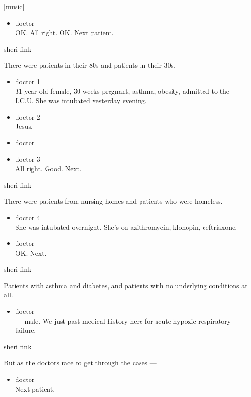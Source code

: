 {[}music{]}

\begin{itemize}
\tightlist
\item
  doctor\\
  OK. All right. OK. Next patient.
\end{itemize}

sheri fink

There were patients in their 80s and patients in their 30s.

\begin{itemize}
\item
  doctor 1\\
  31-year-old female, 30 weeks pregnant, asthma, obesity, admitted to
  the I.C.U. She was intubated yesterday evening.
\item
  doctor 2\\
  Jesus.
\item
  doctor
\item
  doctor 3\\
  All right. Good. Next.
\end{itemize}

sheri fink

There were patients from nursing homes and patients who were homeless.

\begin{itemize}
\item
  doctor 4\\
  She was intubated overnight. She's on azithromycin, klonopin,
  ceftriaxone.
\item
  doctor\\
  OK. Next.
\end{itemize}

sheri fink

Patients with asthma and diabetes, and patients with no underlying
conditions at all.

\begin{itemize}
\tightlist
\item
  doctor\\
  --- male. We just past medical history here for acute hypoxic
  respiratory failure.
\end{itemize}

sheri fink

But as the doctors race to get through the cases ---

\begin{itemize}
\tightlist
\item
  doctor\\
  Next patient.
\end{itemize}

